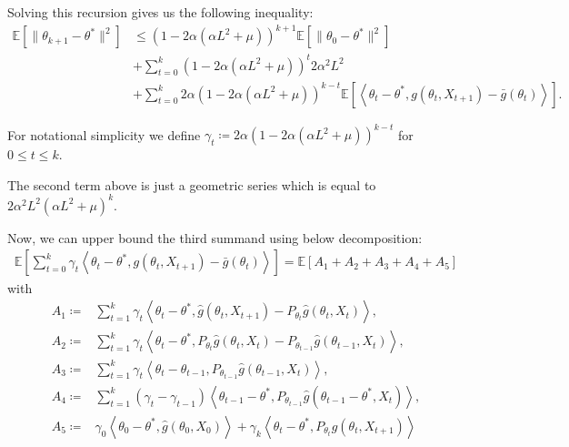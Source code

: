 \documentclass[a4paper]{article}
\newcommand{\norm}[1]{\|#1 \|}
\newcommand{\Exs}{\mathbb{E}}
\newcommand{\thetastar}{\theta^*}
\newcommand{\stepsize}{\alpha}
\begin{document}
Solving this recursion gives us the following inequality:
\begin{align*}
	\Exs\left[\norm{\theta_{k + 1} - \thetastar}^{2}\right] & \le \left(1 - 2\stepsize\left(\stepsize L^{2} + \mu\right)\right)^{k + 1}\Exs\left[\norm{\theta_{0} - \thetastar}^{2}\right] \\
	& + \sum_{t = 0}^{k}\left(1 - 2\stepsize\left(\stepsize L^{2} + \mu\right)\right)^{t}2\stepsize^{2}L^{2} \\
	& + \sum_{t = 0}^{k}2\stepsize\left(1 - 2\stepsize\left(\stepsize L^{2} + \mu\right)\right)^{k - t}\Exs\left[\left\langle \theta_{t} - \thetastar, g\left(\theta_{t}, X_{t + 1}\right) - \bar{g}\left(\theta_{t}\right) \right\rangle\right].
\end{align*}

For notational simplicity we define $\gamma_{t} \coloneq 2\stepsize\left(1 - 2\stepsize\left(\stepsize L^{2} + \mu\right)\right)^{k - t}$ for $0 \le t \le k$.

The second term above is just a geometric series which is equal to $2\stepsize^{2}L^{2}\left(\stepsize L^{2} + \mu\right)^{k}$.

Now, we can upper bound the third summand using below decomposition:
\begin{align*}
	\Exs\left[ \sum_{t = 0}^{k} \gamma_{t}\left\langle \theta_{t} - \thetastar, g(\theta_{t}, X_{t + 1}) - \bar{g}(\theta_{t}) \right\rangle \right] = \Exs\left[ A_{1} + A_{2} + A_{3} + A_{4} + A_{5}\right]
\end{align*}
with
\begin{align*}
	A_{1} \coloneq & \sum_{t = 1}^{k}\gamma_{t}\left\langle \theta_{t} - \thetastar, \hat{g}\left(\theta_{t}, X_{t + 1}\right) - P_{\theta_{t}}\hat{g}\left(\theta_{t}, X_{t}\right) \right\rangle,\\
	A_{2} \coloneq & \sum_{t = 1}^{k}\gamma_{t}\left\langle \theta_{t} - \thetastar, P_{\theta_{t}}\hat{g}\left(\theta_{t}, X_{t}\right) - P_{\theta_{t - 1}}\hat{g}\left( \theta_{t - 1}, X_{t} \right) \right\rangle,\\
	A_{3} \coloneq & \sum_{t = 1}^{k}\gamma_{t}\left\langle \theta_{t} - \theta_{t - 1}, P_{\theta_{t - 1}}\hat{g}\left( \theta_{t - 1}, X_{t}\right) \right\rangle,\\
	A_{4} \coloneq & \sum_{t = 1}^{k}\left(\gamma_{t} - \gamma_{t - 1}\right)\left\langle \theta_{t - 1} - \thetastar, P_{\theta_{t - 1}}\hat{g}\left( \theta_{t - 1} - \thetastar, X_{t}\right) \right\rangle,\\
	A_{5} \coloneq & \gamma_{0}\left\langle \theta_{0} - \thetastar, \hat{g}\left(\theta_{0}, X_{0}\right) \right\rangle + \gamma_{k}\left\langle \theta_{t} - \thetastar, P_{\theta_{t}}\hat{g}\left(\theta_{t}, X_{t + 1}\right)\right\rangle
\end{align*}
\end{document}
